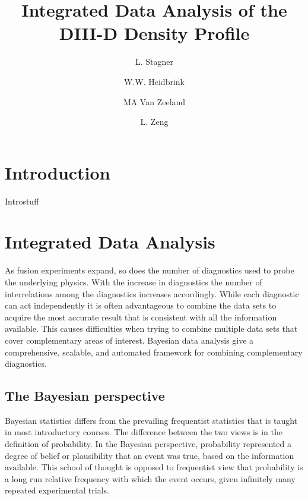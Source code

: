 \documentclass[12pt]{article}
\numberwithin{equation}{section}
\begin{document}
\title{\bf{Integrated Data Analysis of the DIII-D Density Profile}}
\author[1]{L. Stagner}
\author[1]{W.W. Heidbrink}
\author[2]{MA Van Zeeland}
\author[2]{L. Zeng}
\date{}
\maketitle
\begin{abstract}
\end{abstract}
\section{Introduction}
Introstuff

\section{Integrated Data Analysis}
As fusion experiments expand, so does the number of diagnostics used to 
probe the underlying physics. With the increase in diagnostics the 
number of interrelations among the diagnostics increases accordingly. 
While each diagnostic can act independently it is often advantageous to 
combine the data sets to acquire the most accurate result that is 
consistent with all the information available. This causes difficulties 
when trying to combine multiple data sets that cover complementary 
areas of interest. Bayesian data analysis give a comprehensive, 
scalable, and automated framework for combining complementary 
diagnostics.    
\subsection{The Bayesian perspective}
Bayesian statistics differs from the prevailing frequentist statistics 
that is taught in most introductory courses. The difference between the 
two views is in the definition of probability. In the Bayesian 
perspective, probability represented a degree of belief or plausibility 
that an event was true, based on the information available. This school 
of thought is opposed to frequentist view that probability is a long 
run relative frequency with which the event occurs, given infinitely 
many repeated experimental trials.\cite{von2011bayesian}
\end{document}

